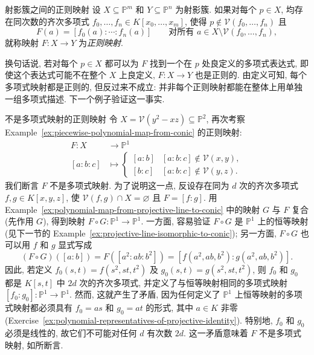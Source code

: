 \begin{Definition}{射影簇之间的正则映射}\leavevmode\label{def:regular-maps-between-projective-varieties}
设 $X\subseteq\mathbb{P}^{m}$ 和 $Y\subseteq\mathbb{P}^{n}$ 为射影簇. 如果对每个 $p\in X$, 均存在同次数的齐次多项式 $f_{0},\ldots,f_{n}\in K[x_{0},\ldots,x_{m}]$, 使得 $p\notin\mathcal{V}(f_{0},\ldots,f_{n})$ 且
\[
  F(a)=[f_{0}(a):\cdots:f_{n}(a)]
  \qquad\text{对所有 }a\in X\setminus\mathcal{V}(f_{0},\ldots,f_{n}),
\]
就称映射 $F:X\to Y$ 为\emph{正则映射}.
\end{Definition}

换句话说, 若对每个 $p\in X$ 都可以为 $F$ 找到一个在 $p$ 处良定义的多项式表达式, 即使这个表达式可能不在整个 $X$ 上良定义, $F:X\to Y$ 也是正则的. 由定义可知, 每个多项式映射都是正则的, 但反过来不成立: 并非每个正则映射都能在整体上用单独一组多项式描述. 下一个例子验证这一事实.

\begin{Example}{不是多项式映射的正则映射}\leavevmode\label{ex:regular-map-not-polynomial-map}
令 $X=\mathcal{V}(y^{2}-xz)\subseteq\mathbb{P}^{2}$, 再次考察 Example~\ref{ex:piecewise-polynomial-map-from-conic} 的正则映射:
\[
  \begin{aligned}
    F:X&\to\mathbb{P}^{1}\\
    [a:b:c]&\mapsto
    \begin{cases}
      [a:b] & [a:b:c]\notin\mathcal{V}(x,y),\\
      [b:c] & [a:b:c]\notin\mathcal{V}(y,z).
    \end{cases}
  \end{aligned}
\]
我们断言 $F$ 不是多项式映射. 为了说明这一点, 反设存在同为 $d$ 次的齐次多项式 $f,g\in K[x,y,z]$, 使 $\mathcal{V}(f,g)\cap X=\varnothing$ 且 $F=[f:g]$. 用 Example~\ref{ex:polynomial-map-from-projective-line-to-conic} 中的映射 $G$ 与 $F$ 复合 (先作用 $G$), 得到映射 $F\circ G:\mathbb{P}^{1}\to\mathbb{P}^{1}$. 一方面, 容易验证 $F\circ G$ 是 $\mathbb{P}^{1}$ 上的恒等映射 (见下一节的 Example~\ref{ex:projective-line-isomorphic-to-conic}); 另一方面, $F\circ G$ 也可以用 $f$ 和 $g$ 显式写成
\[
  (F\circ G)([a:b])=F([a^{2}:ab:b^{2}])=[f(a^{2},ab,b^{2}):g(a^{2},ab,b^{2})].
\]
因此, 若定义 $f_{0}(s,t)=f(s^{2},st,t^{2})$ 及 $g_{0}(s,t)=g(s^{2},st,t^{2})$, 则 $f_{0}$ 和 $g_{0}$ 都是 $K[s,t]$ 中 $2d$ 次的齐次多项式, 并定义了与恒等映射相同的多项式映射 $[f_{0}:g_{0}]:\mathbb{P}^{1}\to\mathbb{P}^{1}$. 然而, 这就产生了矛盾, 因为任何定义了 $\mathbb{P}^{1}$ 上恒等映射的多项式映射都必须具有 $f_{0}=as$ 和 $g_{0}=at$ 的形式, 其中 $a\in K$ 非零 (Exercise~\ref{ex:polynomial-representatives-of-projective-identity}). 特别地, $f_{0}$ 和 $g_{0}$ 必须是线性的, 故它们不可能对任何 $d$ 有次数 $2d$. 这一矛盾意味着 $F$ 不是多项式映射, 如所断言.
\end{Example}


